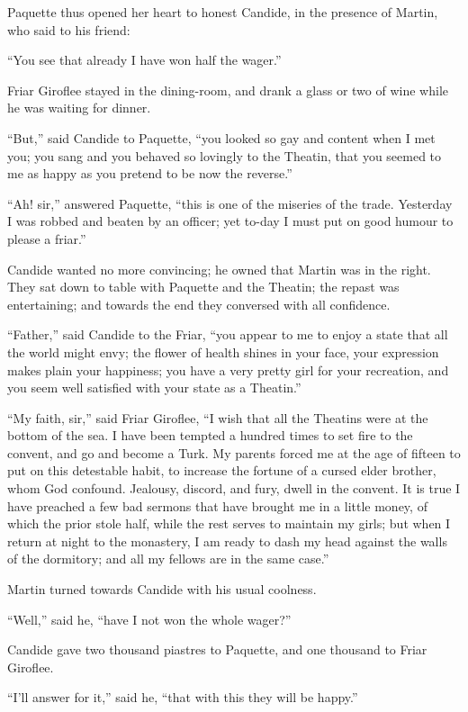Paquette thus opened her heart to honest Candide, in the presence of Martin, who said to his friend:

``You see that already I have won half the wager.''

Friar Giroflee stayed in the dining-room, and drank a glass or two of wine while he was waiting for dinner.

``But,'' said Candide to Paquette, ``you looked so gay and content when I met you; you sang and you behaved so lovingly to the Theatin, that you seemed to me as happy as you pretend to be now the reverse.''

``Ah! sir,'' answered Paquette, ``this is one of the miseries of the trade. Yesterday I was robbed and beaten by an officer; yet to-day I must put on good humour to please a friar.''

Candide wanted no more convincing; he owned that Martin was in the right. They sat down to table with Paquette and the Theatin; the repast was entertaining; and towards the end they conversed with all confidence.

``Father,'' said Candide to the Friar, ``you appear to me to enjoy a state that all the world might envy; the flower of health shines in your face, your expression makes plain your happiness; you have a very pretty girl for your recreation, and you seem well satisfied with your state as a Theatin.''

``My faith, sir,'' said Friar Giroflee, ``I wish that all the Theatins were at the bottom of the sea. I have been tempted a hundred times to set fire to the convent, and go and become a Turk. My parents forced me at the age of fifteen to put on this detestable habit, to increase the fortune of a cursed elder brother, whom God confound. Jealousy, discord, and fury, dwell in the convent. It is true I have preached a few bad sermons that have brought me in a little money, of which the prior stole half, while the rest serves to maintain my girls; but when I return at night to the monastery, I am ready to dash my head against the walls of the dormitory; and all my fellows are in the same case.''

Martin turned towards Candide with his usual coolness.

``Well,'' said he, ``have I not won the whole wager?''

Candide gave two thousand piastres to Paquette, and one thousand to Friar Giroflee.

``I'll answer for it,'' said he, ``that with this they will be happy.''

